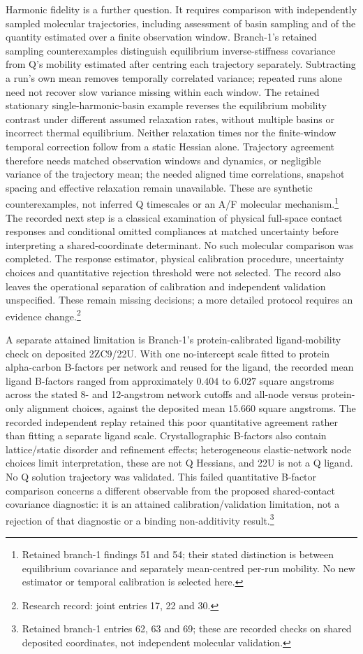 \documentclass{article}
\begin{document}
Harmonic fidelity is a further question. It requires comparison with independently sampled molecular trajectories, including assessment of basin sampling and of the quantity estimated over a finite observation window. Branch-1's retained sampling counterexamples distinguish equilibrium inverse-stiffness covariance from Q's mobility estimated after centring each trajectory separately. Subtracting a run's own mean removes temporally correlated variance; repeated runs alone need not recover slow variance missing within each window. The retained stationary single-harmonic-basin example reverses the equilibrium mobility contrast under different assumed relaxation rates, without multiple basins or incorrect thermal equilibrium. Neither relaxation times nor the finite-window temporal correction follow from a static Hessian alone. Trajectory agreement therefore needs matched observation windows and dynamics, or negligible variance of the trajectory mean; the needed aligned time correlations, snapshot spacing and effective relaxation remain unavailable. These are synthetic counterexamples, not inferred Q timescales or an A/F molecular mechanism.\footnote{Retained branch-1 findings 51 and 54; their stated distinction is between equilibrium covariance and separately mean-centred per-run mobility. No new estimator or temporal calibration is selected here.} The recorded next step is a classical examination of physical full-space contact responses and conditional omitted compliances at matched uncertainty before interpreting a shared-coordinate determinant. No such molecular comparison was completed. The response estimator, physical calibration procedure, uncertainty choices and quantitative rejection threshold were not selected. The record also leaves the operational separation of calibration and independent validation unspecified. These remain missing decisions; a more detailed protocol requires an evidence change.\footnote{Research record: joint entries 17, 22 and 30.}

A separate attained limitation is Branch-1's protein-calibrated ligand-mobility check on deposited 2ZC9/22U. With one no-intercept scale fitted to protein alpha-carbon B-factors per network and reused for the ligand, the recorded mean ligand B-factors ranged from approximately \(0.404\) to \(6.027\) square angstroms across the stated 8- and 12-angstrom network cutoffs and all-node versus protein-only alignment choices, against the deposited mean \(15.660\) square angstroms. The recorded independent replay retained this poor quantitative agreement rather than fitting a separate ligand scale. Crystallographic B-factors also contain lattice/static disorder and refinement effects; heterogeneous elastic-network node choices limit interpretation, these are not Q Hessians, and 22U is not a Q ligand. No Q solution trajectory was validated. This failed quantitative B-factor comparison concerns a different observable from the proposed shared-contact covariance diagnostic: it is an attained calibration/validation limitation, not a rejection of that diagnostic or a binding non-additivity result.\footnote{Retained branch-1 entries 62, 63 and 69; these are recorded checks on shared deposited coordinates, not independent molecular validation.}
\end{document}
